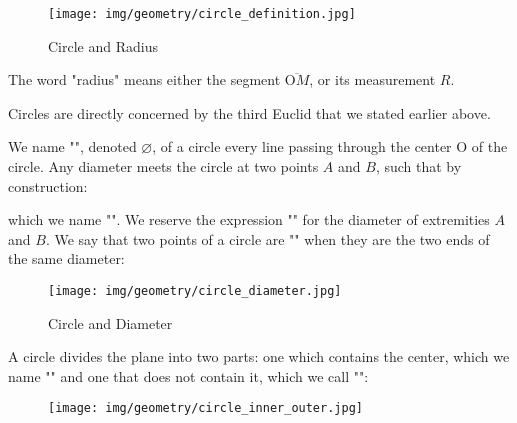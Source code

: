 	\begin{figure}[H]
		\centering
		\texttt{[image: img/geometry/circle\_definition.jpg]}
		\caption{Circle and Radius}
	\end{figure}
	\begin{tcolorbox}[title=Remark,colframe=black,arc=10pt]
	The word "radius" means either the segment $\overline{\text{O}M}$, or its measurement $R$.
	\end{tcolorbox}
	Circles are directly concerned by the third Euclid that we stated earlier above.

	We name "", denoted $\varnothing$, of a circle every line passing through the center O of the circle. Any diameter meets the circle at two points $A$ and $B$, such that by construction:
	
	which we name "". We reserve the expression "" for the diameter of extremities $A$ and $B$. We say that two points of a circle are "" when they are the two ends of the same diameter:
	\begin{figure}[H]
		\centering
		\texttt{[image: img/geometry/circle\_diameter.jpg]}
		\caption{Circle and Diameter}
	\end{figure}

	A circle divides the plane into two parts: one which contains the center, which we name "" and one that does not contain it, which we call "":
	\begin{figure}[H]
		\centering
		\texttt{[image: img/geometry/circle\_inner\_outer.jpg]}
	\end{figure}
	
